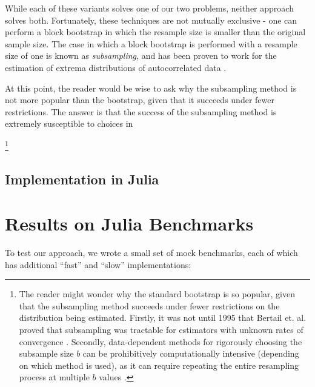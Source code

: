 \documentclass[conference]{IEEEtran}
\begin{document}
While each of these variants solves one of our two problems, neither approach solves both.
Fortunately, these techniques are not mutually exclusive - one can perform a block bootstrap
in which the resample size is smaller than the original sample size. The case in which a
block bootstrap is performed with a resample size of one is known as \textit{subsampling},
and has been proven to work for the estimation of extrema distributions of autocorrelated
data .

At this point, the reader would be wise to ask why the subsampling method is not more
popular than the bootstrap, given that it succeeds under fewer restrictions. The answer
is that the success of the subsampling method is extremely susceptible to choices in



 \footnote{The reader might wonder why the standard bootstrap is so
popular, given that the subsampling method succeeds under fewer restrictions on the
distribution being estimated. Firstly, it was not until 1995 that Bertail et. al. proved
that subsampling was tractable for estimators with unknown rates of convergence .
Secondly, data-dependent methods for rigorously choosing the subsample size $b$ can be
prohibitively computationally intensive (depending on which method is used), as it can
require repeating the entire resampling process at multiple $b$ values .}

\subsection{Implementation in Julia}

\label{sec:julia}
\section{Results on Julia Benchmarks}

To test our approach, we wrote a small set of mock benchmarks, each of which has additional
``fast'' and ``slow'' implementations:
\end{document}
